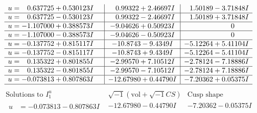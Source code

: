 \documentclass[1p]{elsarticle_modified}
\theoremstyle{definition}
\newcommand{\I}{\sqrt{-1}}
\begin{document}
$$\begin{array}{c|c|c}
\begin{aligned}
u &= \phantom{-}0.637725 + 0.530123 I\end{aligned}
 & \phantom{-}0.99322 + 2.46697 I & \phantom{-}1.50189 - 3.71848 I \\ \hline\begin{aligned}
u &= \phantom{-}0.637725 - 0.530123 I\end{aligned}
 & \phantom{-}0.99322 - 2.46697 I & \phantom{-}1.50189 + 3.71848 I \\ \hline\begin{aligned}
u &= -1.107000 + 0.388573 I\end{aligned}
 & -9.04626 + 0.50923 I & \phantom{-0.000000 } 0 \\ \hline\begin{aligned}
u &= -1.107000 - 0.388573 I\end{aligned}
 & -9.04626 - 0.50923 I & \phantom{-0.000000 } 0 \\ \hline\begin{aligned}
u &= -0.137752 + 0.815117 I\end{aligned}
 & -10.8743 - 9.4349 I & -5.12264 + 5.41104 I \\ \hline\begin{aligned}
u &= -0.137752 - 0.815117 I\end{aligned}
 & -10.8743 + 9.4349 I & -5.12264 - 5.41104 I \\ \hline\begin{aligned}
u &= \phantom{-}0.135322 + 0.801855 I\end{aligned}
 & -2.99570 + 7.10512 I & -2.78124 - 7.18886 I \\ \hline\begin{aligned}
u &= \phantom{-}0.135322 - 0.801855 I\end{aligned}
 & -2.99570 - 7.10512 I & -2.78124 + 7.18886 I \\ \hline\begin{aligned}
u &= -0.073813 + 0.807863 I\end{aligned}
 & -12.67980 + 0.44790 I & -7.20362 + 0.05375 I\\
 \hline 
 \end{array}$$\newpage$$\begin{array}{c|c|c}  
\text{Solutions to }I^u_{1}& \I (\text{vol} + \sqrt{-1}CS) & \text{Cusp shape}\\
 \hline 
\begin{aligned}
u &= -0.073813 - 0.807863 I\end{aligned}
 & -12.67980 - 0.44790 I & -7.20362 - 0.05375 I \\ \hline\begin{aligned}

\end{aligned}
\end{array}$$
\end{document}
